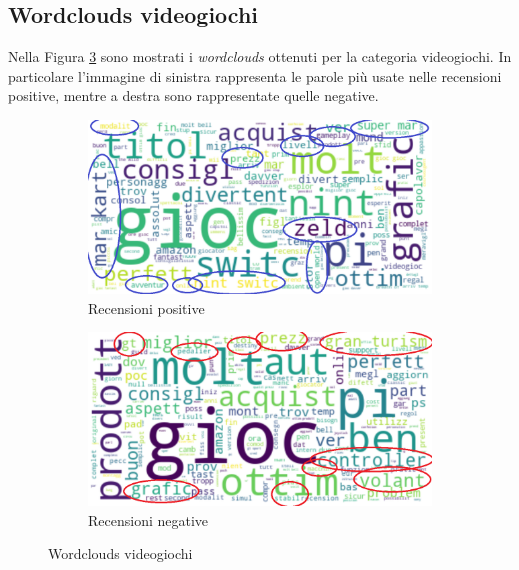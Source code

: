 			
			\subsection{Wordclouds videogiochi}
				Nella Figura \ref{fig:wordclouds_videogames} sono mostrati i \textit{wordclouds} ottenuti per la categoria videogiochi. In particolare l'immagine di sinistra rappresenta le parole più usate nelle recensioni positive, mentre a destra sono rappresentate quelle negative. 
				
				\begin{figure} [h]
					\centering
					\begin{subfigure}{0.48\textwidth}
						\includegraphics[width=\textwidth]{Figure/top_positive_videogames}
						\caption{Recensioni positive}
						\label{fig:top_positive_videogames}
					\end{subfigure}
					\begin{subfigure}{0.48\textwidth}
						\includegraphics[width=\textwidth]{Figure/top_negative_videogames}
						\caption{Recensioni negative}
						\label{fig:top_negative_videogames}
					\end{subfigure}
					\caption{Wordclouds videogiochi}\label{fig:wordclouds_videogames}
				\end{figure}
				
